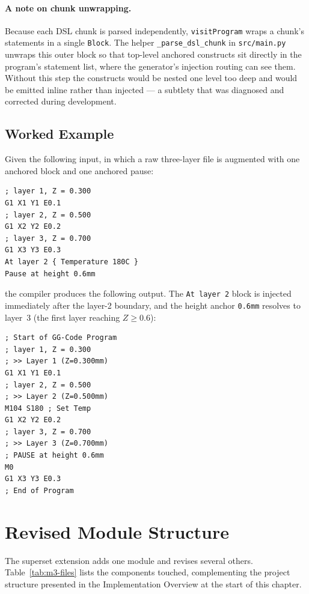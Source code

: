 \paragraph{A note on chunk unwrapping.}
Because each DSL chunk is parsed independently, \texttt{visitProgram} wraps a chunk's statements in a single \texttt{Block}. The helper \texttt{\_parse\_dsl\_chunk} in \texttt{src/main.py} unwraps this outer block so that top-level anchored constructs sit directly in the program's statement list, where the generator's injection routing can see them. Without this step the constructs would be nested one level too deep and would be emitted inline rather than injected --- a subtlety that was diagnosed and corrected during development.

\subsection*{Worked Example}

Given the following input, in which a raw three-layer file is augmented with one anchored block and one anchored pause:

\begin{verbatim}
; layer 1, Z = 0.300
G1 X1 Y1 E0.1
; layer 2, Z = 0.500
G1 X2 Y2 E0.2
; layer 3, Z = 0.700
G1 X3 Y3 E0.3
At layer 2 { Temperature 180C }
Pause at height 0.6mm
\end{verbatim}

the compiler produces the following output. The \texttt{At layer 2} block is injected immediately after the layer-2 boundary, and the height anchor \texttt{0.6mm} resolves to layer~3 (the first layer reaching $Z \geq 0.6$):

\begin{verbatim}
; Start of GG-Code Program
; layer 1, Z = 0.300
; >> Layer 1 (Z=0.300mm)
G1 X1 Y1 E0.1
; layer 2, Z = 0.500
; >> Layer 2 (Z=0.500mm)
M104 S180 ; Set Temp
G1 X2 Y2 E0.2
; layer 3, Z = 0.700
; >> Layer 3 (Z=0.700mm)
; PAUSE at height 0.6mm
M0
G1 X3 Y3 E0.3
; End of Program
\end{verbatim}

\section{Revised Module Structure}

The superset extension adds one module and revises several others. Table~\ref{tab:m3-files} lists the components touched, complementing the project structure presented in the Implementation Overview at the start of this chapter.

